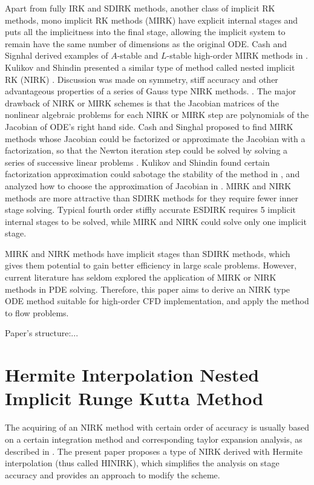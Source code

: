\documentclass[preprint,12pt]{elsarticle}
\begin{document}
Apart from fully IRK and SDIRK methods,
another class of implicit RK methods,
mono implicit RK methods (MIRK)
\cite{cash1975classMIRKOrig}
have explicit internal stages and
puts all the implicitness into the final
stage, allowing the implicit system to
remain have the same number of dimensions
as the original ODE.
Cash and Signhal derived examples of
$A$-stable and $L$-stable high-order
MIRK methods in
\cite{cash1977clasMIRK1,cash1982monoMIRK2}.
Kulikov and Shindin presented a similar type
of method called nested implicit RK (NIRK)
\cite{kulikov2006familyNIRKOrig}.
Discussion was made on symmetry, stiff accuracy and
other advantageous properties of a series of Gauss type
NIRK methods.
\cite{kulikov2009adaptive}.
The major drawback of NIRK or MIRK schemes is that
the Jacobian matrices of the nonlinear algebraic problems
for each NIRK or MIRK step are
polynomials of the Jacobian of ODE's right hand side.
Cash and Singhal proposed to find MIRK methods whose
Jacobian could be factorized or approximate the Jacobian
with a factorization,
so that the Newton iteration
step could be solved by solving a series of successive linear
problems \cite{cash1982monoMIRK2}.
Kulikov and Shindin found certain factorization
approximation could sabotage the stability of
the method in
\cite{kulikov2009adaptive},
and analyzed how to choose the approximation of
Jacobian in
\cite{kulikov2007asymptotic}.
MIRK and NIRK methods are more attractive than SDIRK methods
for they require fewer inner stage solving.
Typical fourth order
stiffly accurate ESDIRK requires 5 implicit internal stages to be
solved,
while MIRK and NIRK could
solve only one implicit stage.


MIRK and NIRK methods have implicit stages than SDIRK methods,
which gives them potential to gain better efficiency in
large scale problems.
However, current literature has seldom explored
the application of MIRK or NIRK methods in
PDE solving.
Therefore, this paper aims to
derive an NIRK type ODE method suitable for high-order
CFD implementation,
and apply the method to flow problems.

Paper's structure:...%


\section{Hermite Interpolation Nested Implicit Runge Kutta Method}
\label{sec:HINIRK}

The acquiring of an NIRK method with
certain order of accuracy is usually based on
a certain integration method and
corresponding taylor expansion analysis,
as described in \cite{kulikov2006familyNIRKOrig}.
The present paper proposes a type of NIRK
derived with Hermite interpolation
(thus called HINIRK),
which simplifies the analysis on
stage accuracy and provides an approach to
modify the scheme.
\end{document}
